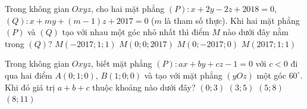 \begin{ex}%
	Trong không gian $Oxyz$, cho hai mặt phẳng $(P)\colon x+2y-2z+2018=0$, $(Q)\colon x+my+(m-1)z+2017=0$ ($m$ là tham số thực). Khi hai mặt phẳng $(P)$ và $(Q)$ tạo với nhau một góc nhỏ nhất thì điểm $M$ nào dưới đây nằm trong $(Q)$?
	\choice
	{\True $M(-2017;1;1)$}
	{$M(0;0;2017)$}
	{$M(0;-2017;0)$}
	{$M(2017;1;1)$}
\end{ex}
\begin{ex}%
	Trong không gian $Oxyz$, biết mặt phẳng $(P):ax+by+cz-1=0$ với $c<0$ đi qua hai điểm $A(0;1;0)$, $B(1;0;0)$ và tạo với mặt phẳng $(yOz)$ một góc $60^\circ$. Khi đó giá trị $a+b+c$ thuộc khoảng nào dưới đây?
	\choice
	{\True $(0;3)$}
	{$(3;5)$}
	{$(5;8)$}
	{$(8;11)$}
\end{ex}
